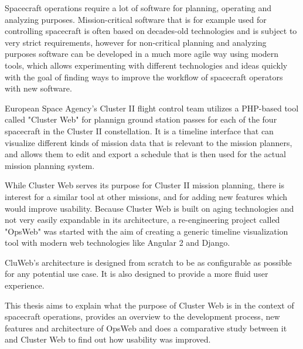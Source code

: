 Spacecraft operations require a lot of software for planning, operating and analyzing purposes. Mission-critical software that is for example used for controlling spacecraft is often based on decades-old technologies and is subject to very strict requirements, however for non-critical planning and analyzing purposes software can be developed in a much more agile way using modern tools, which allows experimenting with different technologies and ideas quickly with the goal of finding ways to improve the workflow of spacecraft operators with new software.

European Space Agency's Cluster II flight control team utilizes a PHP-based tool called "Cluster Web" for plannign ground station passes for each of the four spacecraft in the Cluster II constellation. It is a timeline interface that can visualize different kinds of mission data that is relevant to the mission planners, and allows them to edit and export a schedule that is then used for the actual mission planning system.

While Cluster Web serves its purpose for Cluster II mission planning, there is interest for a similar tool at other missions, and for adding new features which would improve usability. Because Cluster Web is built on aging technologies and not very easily expandable in its architecture, a re-engineering project called "OpsWeb" was started with the aim of creating a generic timeline visualization tool with modern web technologies like Angular 2 and Django.

CluWeb's architecture is designed from scratch to be as configurable as possible for any potential use case. It is also designed to provide a more fluid user experience.

This thesis aims to explain what the purpose of Cluster Web is in the context of spacecraft operations, provides an overview to the development process, new features and architecture of OpsWeb and does a comparative study between it and Cluster Web to find out how usability was improved.